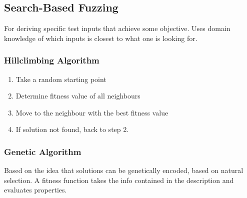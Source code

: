 \documentclass[11pt]{article}
\begin{document}
\subsection{Search-Based Fuzzing}
\label{sec:org2b29be5}
For deriving specific test inputs that achieve some objective.
Uses domain knowledge of which inputs is closest to what one is looking for.
\subsubsection{Hillclimbing Algorithm}
\label{sec:org08aef75}
\begin{enumerate}
\item Take a random starting point
\item Determine fitness value of all neighbours
\item Move to the neighbour with the best fitness value
\item If solution not found, back to step 2.
\end{enumerate}
\subsubsection{Genetic Algorithm}
\label{sec:orgf655098}
Based on the idea that solutions can be genetically encoded, based on natural
selection.
A fitness function takes the info contained in the description and evaluates
properties.
\end{document}
